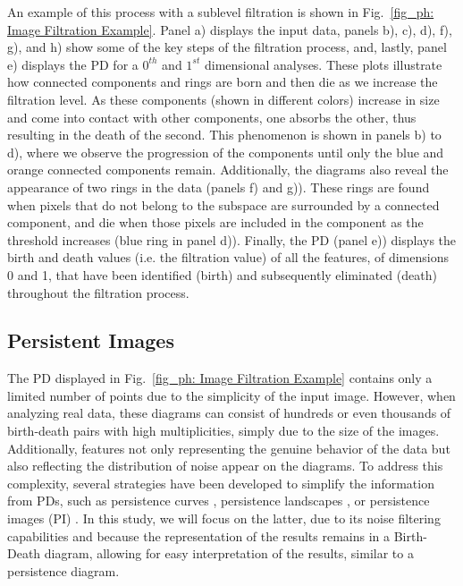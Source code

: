 An example of this process with a sublevel filtration is shown in Fig.~\ref{fig_ph: Image Filtration Example}. Panel a) displays the input data, panels b), c), d), f), g), and h) show some of the key steps of the filtration process, and, lastly, panel e) displays the PD for a $0^{th}$ and $1^{st}$ dimensional analyses. These plots illustrate how connected components and rings are born and then die as we increase the filtration level. As these components (shown in different colors) increase in size and come into contact with other components, one absorbs the other, thus resulting in the death of the second. This phenomenon is shown in panels b) to d), where we observe the progression of the components until only the blue and orange connected components remain. Additionally, the diagrams also reveal the appearance of two rings in the data (panels f) and g)). These rings are found when pixels that do not belong to the subspace are surrounded by a connected component, and die when those pixels are included in the component as the threshold increases (blue ring in panel d)). Finally, the PD (panel e)) displays the birth and death values (i.e. the filtration value) of all the features, of dimensions 0 and 1, that have been identified (birth) and subsequently eliminated (death) throughout the filtration process. 

\subsection{Persistent Images}

The PD displayed in Fig.~\ref{fig_ph: Image Filtration Example} contains only a limited number of points due to the simplicity of the input image. However, when analyzing real data, these diagrams can consist of hundreds or even thousands of birth-death pairs with high multiplicities, simply due to the size of the images. Additionally, features not only representing the genuine behavior of the data but also reflecting the distribution of noise appear on the diagrams. To address this complexity, several strategies have been developed to simplify the information from PDs, such as persistence curves  \citep{persistence_curves}, persistence landscapes \citep{persistence_landscapes}, or persistence images (PI) \citep{persistence_images}. In this study, we will focus on the latter, due to its noise filtering capabilities and because the representation of the results remains in a Birth-Death diagram, allowing for easy interpretation of the results, similar to a persistence diagram.

